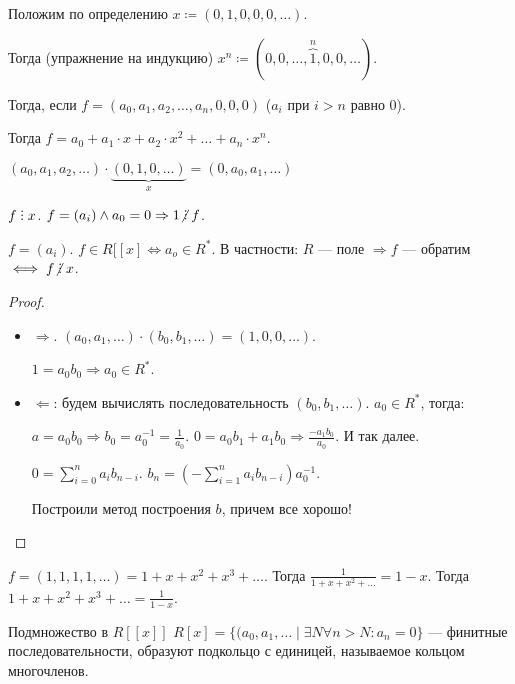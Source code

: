 \begin{remark}
    Положим по определению $x \coloneqq (0, 1, 0, 0, 0, \ldots)$. 

    Тогда (упражнение на индукцию) $x^n \coloneqq (0, 0,\ldots, \overbrace{1}^n, 0, 0, \ldots)$. 

    Тогда, если $f= (a_0, a_1,a_2,\ldots,a_n, 0, 0, 0)$ ($a_i$ при  $i > n$ равно 0). 

    Тогда $f = a_0 + a_1 \cdot x + a_2 \cdot x^2 + \ldots + a_n \cdot x^n$. 
\end{remark}
\begin{remark}
    $(a_0, a_1, a_2,\ldots) \cdot \underbrace{(0, 1, 0,\ldots)}_{x} = (0, a_0, a_1, \ldots)$
\end{remark}
\begin{consequence}
    $f \divby x$.  $f = (a_i) \land a_0 = 0 \Rightarrow 1 \centernot \divby f$. 
\end{consequence}
\begin{theorem}
    $f = (a_i)$.  $f \in R[[x] \iff a_o \in R^*$. В частности: $R$ --- поле  $\Rightarrow f$ --- обратим $\iff f \centernot \divby x$. 
\end{theorem}
\begin{proof}
    \slashn
     \begin{itemize}
         \item $\Rightarrow$.  $(a_0, a_1, \ldots) \cdot (b_0, b_1, \ldots) = (1, 0, 0,\ldots)$.

             $1 = a_0b_0 \Rightarrow a_0\in R^*$.
         \item $\Leftarrow$: будем вычислять последовательность  $(b_0, b_1,\ldots)$. $a_0 \in R^*$, тогда: 

             $a = a_0b_0 \Rightarrow b_0 = a_0^{-1} = \frac{1}{a_0}$. $0 = a_0b_1 + a_1b_0 \Rightarrow \frac{-a_1b_0}{a_0}$. И так далее.

             $0 = \sum_{i=0}^n a_i b_{n-i}$.  $b_n = (-\sum_{i=1}^n a_i b_{n-i})a_0^{-1}$.  

             Построили метод построения $b$, причем все хорошо!
    \end{itemize}
\end{proof}
\begin{example}
    $f = (1, 1, 1, 1, \ldots) = 1+x+x^2+x^3+\ldots$. Тогда $\frac{1}{1+x+x^2+\ldots} = 1-x$. Тогда $1+x+x^2+x^3+\ldots = \frac{1}{1-x}$.
\end{example}
\begin{theorem}
    Подмножество в $R[[x]]$  $R[x] = \{(a_0,a_1,\ldots \mid \exists N \forall n > N\!: a_n=0\}$ --- финитные последовательности, образуют подкольцо с единицей, называемое кольцом многочленов.
\end{theorem}
